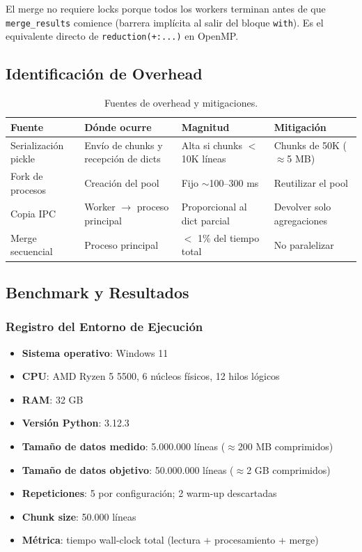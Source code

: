 \documentclass[10pt,a4paper]{article}
\begin{document}
El merge no requiere locks porque todos los workers terminan antes de que
\texttt{merge\_results} comience (barrera impl\'icita al salir del bloque
\texttt{with}). Es el equivalente directo de \texttt{reduction(+:...)} en
OpenMP.

\subsection{Identificaci\'on de Overhead}

\begin{table}[H]
\centering
\begin{tabular}{p{3cm}p{4cm}p{3.5cm}p{3cm}}
\toprule
\textbf{Fuente} & \textbf{D\'onde ocurre} & \textbf{Magnitud} & \textbf{Mitigaci\'on} \\
\midrule
Serializaci\'on pickle & Env\'io de chunks y recepci\'on de dicts & Alta si chunks $<$ 10K l\'ineas & Chunks de 50K ($\approx$5 MB) \\
Fork de procesos & Creaci\'on del pool & Fijo $\sim$100--300 ms & Reutilizar el pool \\
Copia IPC & Worker $\to$ proceso principal & Proporcional al dict parcial & Devolver solo agregaciones \\
Merge secuencial & Proceso principal & $<$ 1\% del tiempo total & No paralelizar \\
\bottomrule
\end{tabular}
\caption{Fuentes de overhead y mitigaciones.}
\end{table}

\subsection{Benchmark y Resultados}

\subsubsection{Registro del Entorno de Ejecuci\'on}

\begin{itemize}
    \item \textbf{Sistema operativo}: Windows 11
    \item \textbf{CPU}: AMD Ryzen 5 5500, 6 n\'ucleos f\'isicos, 12 hilos l\'ogicos
    \item \textbf{RAM}: 32 GB 
    \item \textbf{Versi\'on Python}: 3.12.3
    \item \textbf{Tama\~no de datos medido}: 5.000.000 l\'ineas ($\approx$200 MB comprimidos)
    \item \textbf{Tama\~no de datos objetivo}: 50.000.000 l\'ineas ($\approx$2 GB comprimidos)
    \item \textbf{Repeticiones}: 5 por configuraci\'on; 2 warm-up descartadas
    \item \textbf{Chunk size}: 50.000 l\'ineas
    \item \textbf{M\'etrica}: tiempo wall-clock total (lectura + procesamiento + merge)
\end{itemize}
\end{document}
